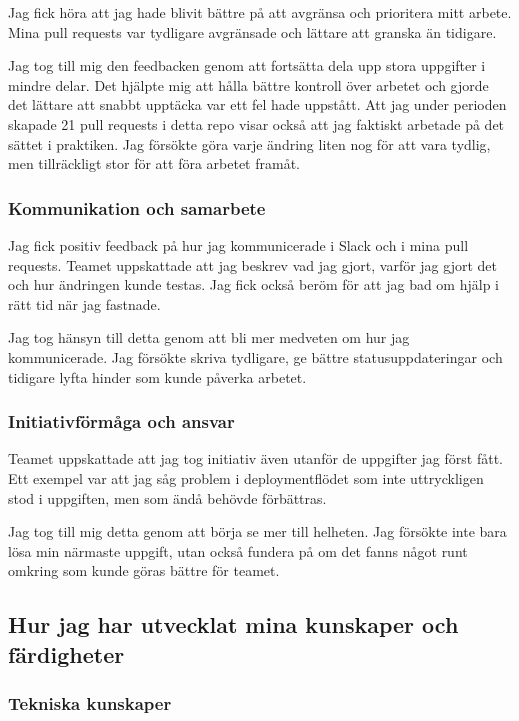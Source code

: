 Jag fick höra att jag hade blivit bättre på att avgränsa och prioritera mitt arbete. Mina pull
requests var tydligare avgränsade och lättare att granska än tidigare.

Jag tog till mig den feedbacken genom att fortsätta dela upp stora uppgifter i mindre delar.
Det hjälpte mig att hålla bättre kontroll över arbetet och gjorde det lättare att snabbt upptäcka
var ett fel hade uppstått. Att jag under perioden skapade 21 pull requests i detta repo visar
också att jag faktiskt arbetade på det sättet i praktiken. Jag försökte göra varje ändring liten
nog för att vara tydlig, men tillräckligt stor för att föra arbetet framåt.

\subsubsection{Kommunikation och samarbete}
\label{subsubsec:samarbete_feedback}

Jag fick positiv feedback på hur jag kommunicerade i Slack och i mina pull requests. Teamet
uppskattade att jag beskrev vad jag gjort, varför jag gjort det och hur ändringen kunde testas.
Jag fick också beröm för att jag bad om hjälp i rätt tid när jag fastnade.

Jag tog hänsyn till detta genom att bli mer medveten om hur jag kommunicerade. Jag försökte
skriva tydligare, ge bättre statusuppdateringar och tidigare lyfta hinder som kunde påverka
arbetet.

\subsubsection{Initiativförmåga och ansvar}
\label{subsubsec:prestation_feedback}

Teamet uppskattade att jag tog initiativ även utanför de uppgifter jag först fått. Ett exempel var
att jag såg problem i deploymentflödet som inte uttryckligen stod i uppgiften, men som ändå
behövde förbättras.

Jag tog till mig detta genom att börja se mer till helheten. Jag försökte inte bara lösa min
närmaste uppgift, utan också fundera på om det fanns något runt omkring som kunde göras
bättre för teamet.

\subsection{Hur jag har utvecklat mina kunskaper och färdigheter}
\label{subsec:utveckling}

\subsubsection{Tekniska kunskaper}
\label{subsubsec:kunskaper_utveckling}

